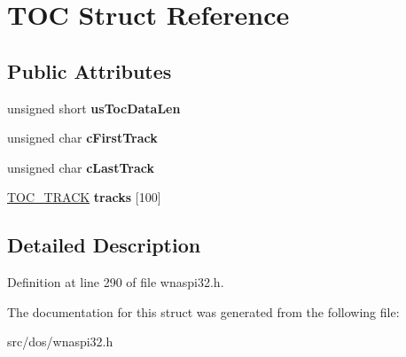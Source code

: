 \hypertarget{structTOC}{\section{T\-O\-C Struct Reference}
\label{structTOC}
}
\subsection*{Public Attributes}
\begin{DoxyCompactItemize}
\item 
\hypertarget{structTOC_a67a808b5082029dcefd399a51f92c415}{unsigned short {\bfseries us\-Toc\-Data\-Len}}\label{structTOC_a67a808b5082029dcefd399a51f92c415}

\item 
\hypertarget{structTOC_a86ac62efde8208c82603c667716d9dbd}{unsigned char {\bfseries c\-First\-Track}}\label{structTOC_a86ac62efde8208c82603c667716d9dbd}

\item 
\hypertarget{structTOC_a768ea984bdbc10b962c40748bea43c48}{unsigned char {\bfseries c\-Last\-Track}}\label{structTOC_a768ea984bdbc10b962c40748bea43c48}

\item 
\hypertarget{structTOC_abe7ed7736fded60b79d9d79f5662d69f}{\hyperlink{structTOC__TRACK}{T\-O\-C\-\_\-\-T\-R\-A\-C\-K} {\bfseries tracks} \mbox{[}100\mbox{]}}\label{structTOC_abe7ed7736fded60b79d9d79f5662d69f}

\end{DoxyCompactItemize}


\subsection{Detailed Description}


Definition at line 290 of file wnaspi32.\-h.



The documentation for this struct was generated from the following file\-:\begin{DoxyCompactItemize}
\item 
src/dos/wnaspi32.\-h\end{DoxyCompactItemize}
